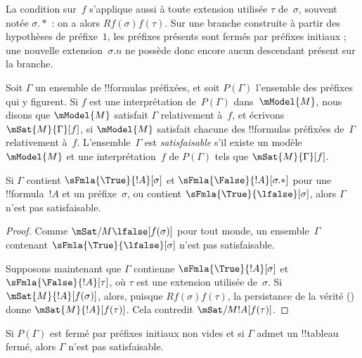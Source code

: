 \documentclass[../../../include/open-logic-section]{subfiles}
\begin{document}
La condition sur~$f$ s'applique aussi à toute extension utilisée
$\tau$ de~$\sigma$, souvent notée $\sigma.{*}$ : on a alors
$Rf(\sigma)f(\tau)$. Sur une branche construite à partir des
hypothèses de préfixe~$1$, les préfixes présents sont fermés par
préfixes initiaux ; une nouvelle extension~$\sigma.n$ ne possède
donc encore aucun descendant présent sur la branche.

\begin{defn}
  Soit $\Gamma$ un ensemble de !!{formula}s préfixées, et soit
  $P(\Gamma)$ l'ensemble des préfixes qui y figurent. Si $f$ est une
  interprétation de~$P(\Gamma)$ dans~$\mModel{M}$, nous disons que
  $\mModel{M}$ satisfait $\Gamma$ relativement à~$f$, et écrivons
  $\mSat{M}{\Gamma}[f]$, si $\mModel{M}$ satisfait chacune des
  !!{formula}s préfixées de~$\Gamma$ relativement à~$f$.
  L'ensemble~$\Gamma$ est \emph{satisfaisable} s'il existe un
  modèle~$\mModel{M}$ et une interprétation~$f$ de $P(\Gamma)$ tels
  que $\mSat{M}{\Gamma}[f]$.
\end{defn}

\begin{prop}
  Si $\Gamma$ contient $\sFmla{\True}{!A}[\sigma]$ et
  $\sFmla{\False}{!A}[\sigma.{*}]$ pour une !!{formula}~$!A$ et un
  préfixe~$\sigma$, ou contient
  $\sFmla{\True}{\lfalse}[\sigma]$, alors $\Gamma$ n'est pas
  satisfaisable.
\end{prop}

\begin{proof}
  Comme $\mSat/{M}{\lfalse}[f(\sigma)]$ pour tout monde, un
  ensemble~$\Gamma$ contenant
  $\sFmla{\True}{\lfalse}[\sigma]$ n'est pas satisfaisable.

  Supposons maintenant que $\Gamma$ contienne
  $\sFmla{\True}{!A}[\sigma]$ et
  $\sFmla{\False}{!A}[\tau]$, où $\tau$ est une extension utilisée
  de~$\sigma$. Si $\mSat{M}{!A}[f(\sigma)]$, alors, puisque
  $Rf(\sigma)f(\tau)$, la persistance de la vérité
  () donne
  $\mSat{M}{!A}[f(\tau)]$. Cela contredit
  $\mSat/{M}{!A}[f(\tau)]$.
\end{proof}

\begin{thm}[Correction]
  Si $P(\Gamma)$ est fermé par préfixes initiaux non vides et si
  $\Gamma$ admet un !!{tableau} fermé, alors $\Gamma$ n'est pas
  satisfaisable.
\end{thm}
\end{document}

